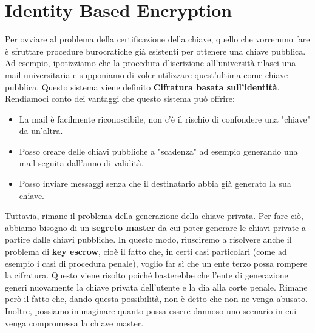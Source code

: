 \section{Identity Based Encryption}
Per ovviare al problema della certificazione della chiave, quello che vorremmo fare è sfruttare procedure burocratiche già esistenti per ottenere una chiave pubblica. Ad esempio, ipotizziamo che la procedura d'iscrizione all'università rilasci una mail universitaria e supponiamo di voler utilizzare quest'ultima come chiave pubblica. Questo sistema viene definito \textbf{Cifratura basata sull'identità}. Rendiamoci conto dei vantaggi che questo sistema può offrire:
\begin{itemize}
    \item La mail è facilmente riconoscibile, non c'è il rischio di confondere una "chiave" da un'altra.
    \item Posso creare delle chiavi pubbliche a "scadenza" ad esempio generando una mail seguita dall'anno di validità.
    \item Posso inviare messaggi senza che il destinatario abbia già generato la sua chiave.
\end{itemize}

Tuttavia, rimane il problema della generazione della chiave privata. Per fare ciò, abbiamo bisogno di un \textbf{segreto master} da cui poter generare le chiavi private a partire dalle chiavi pubbliche. In questo modo, riusciremo a risolvere anche il problema di \textbf{key escrow}, cioè il fatto che, in certi casi particolari (come ad esempio i casi di procedura penale), voglio far sì che un ente terzo possa rompere la cifratura. Questo viene risolto poiché basterebbe che l'ente di generazione generi nuovamente la chiave privata dell'utente e la dia alla corte penale. Rimane però il fatto che, dando questa possibilità, non è detto che non ne venga abusato. Inoltre, possiamo immaginare quanto possa essere dannoso uno scenario in cui venga compromessa la chiave master.
